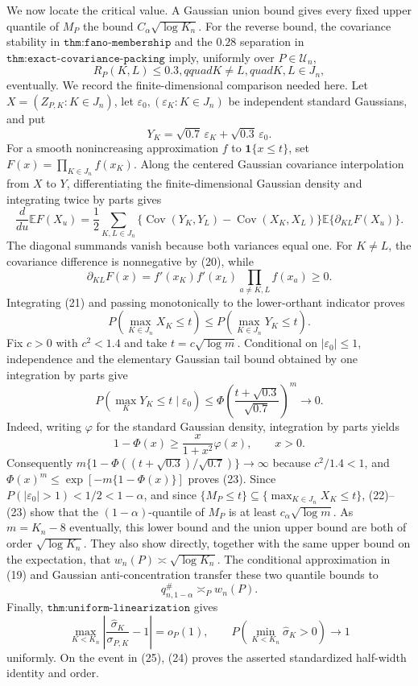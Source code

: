 We now locate the critical value.  A Gaussian union bound gives every fixed upper quantile of \(M_P\) the bound \(C_\alpha\sqrt{\log K_n}\).  For the reverse bound, the covariance stability in \(\texttt{thm:fano-membership}\) and the \(0.28\) separation in \(\texttt{thm:exact-covariance-packing}\) imply, uniformly over \(P\in\mathcal U_n\),
\[
 R_P(K,L)\leq0.3,qquad K\ne L,quad K,L\in J_n,
 \tag{20}
\]
eventually.  We record the finite-dimensional comparison needed here.  Let \(X=(Z_{P,K}:K\in J_n)\), let \(\varepsilon_0,(\varepsilon_K:K\in J_n)\) be independent standard Gaussians, and put
\[
 Y_K=\sqrt{0.7}\,\varepsilon_K+\sqrt{0.3}\,\varepsilon_0.
\]
For a smooth nonincreasing approximation \(f\) to \(\mathbf1\{x\leq t\}\), set \(F(x)=\prod_{K\in J_n}f(x_K)\).  Along the centered Gaussian covariance interpolation from \(X\) to \(Y\), differentiating the finite-dimensional Gaussian density and integrating twice by parts gives
\[
 \frac{d}{du}\mathbb EF(X_u)
 =\frac12\sum_{K,L\in J_n}
 \{\operatorname{Cov}(Y_K,Y_L)-\operatorname{Cov}(X_K,X_L)\}
 \mathbb E\{\partial_{KL}F(X_u)\}.
 \tag{21}
\]
The diagonal summands vanish because both variances equal one.  For \(K\ne L\), the covariance difference is nonnegative by (20), while
\[
 \partial_{KL}F(x)=f'(x_K)f'(x_L)
 \prod_{a\ne K,L}f(x_a)\geq0.
\]
Integrating (21) and passing monotonically to the lower-orthant indicator proves
\[
 P\!\left(\max_{K\in J_n}X_K\leq t\right)
 \leq
 P\!\left(\max_{K\in J_n}Y_K\leq t\right).
 \tag{22}
\]
Fix \(c>0\) with \(c^2<1.4\) and take \(t=c\sqrt{\log m}\).  Conditional on \(|\varepsilon_0|\leq1\), independence and the elementary Gaussian tail bound obtained by one integration by parts give
\[
P\!\left(\max_KY_K\leq t\mid\varepsilon_0\right)
\leq
\Phi\!\left(\frac{t+\sqrt{0.3}}{\sqrt{0.7}}\right)^m
\longrightarrow0.
\tag{23}
\]
Indeed, writing \(\varphi\) for the standard Gaussian density, integration by parts yields
\[
 1-\Phi(x)\geq\frac{x}{1+x^2}\varphi(x),\qquad x>0.
\]
Consequently \(m\{1-\Phi((t+\sqrt{0.3})/\sqrt{0.7})\}\to\infty\) because \(c^2/1.4<1\), and \(\Phi(x)^m\leq\exp[-m\{1-\Phi(x)\}]\) proves (23).  Since \(P(|\varepsilon_0|>1)<1/2<1-\alpha\), and since \(\{M_P\leq t\}\subseteq\{\max_{K\in J_n}X_K\leq t\}\), (22)--(23) show that the \((1-\alpha)\)-quantile of \(M_P\) is at least \(c_\alpha\sqrt{\log m}\).  As \(m=K_n-8\) eventually, this lower bound and the union upper bound are both of order \(\sqrt{\log K_n}\).  They also show directly, together with the same upper bound on the expectation, that \(w_n(P)\asymp\sqrt{\log K_n}\).  The conditional approximation in (19) and Gaussian anti-concentration transfer these two quantile bounds to
\[
 q_{n,1-\alpha}^{\#}\asymp_P w_n(P).
 \tag{24}
\]
Finally, \(\texttt{thm:uniform-linearization}\) gives
\[
 \max_{K<K_n}\left|\frac{\widehat\sigma_K}{\sigma_{P,K}}-1\right|=o_P(1),
 \qquad
 P\!\left(\min_{K<K_n}\widehat\sigma_K>0\right)\longrightarrow1
 \tag{25}
\]
uniformly.  On the event in (25), (24) proves the asserted standardized half-width identity and order.

